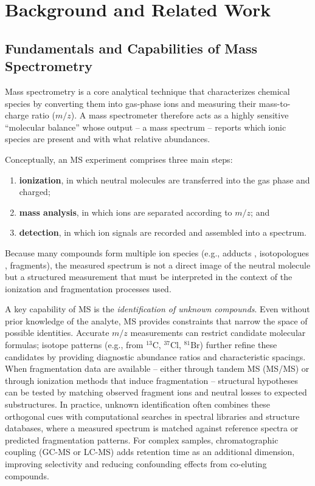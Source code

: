 \chapter{Background and Related Work}
\label{ch:2}
\noindent
\section{Fundamentals and Capabilities of Mass Spectrometry}
Mass spectrometry is a core analytical technique that characterizes chemical species by converting them into gas-phase ions and measuring their mass-to-charge ratio ($m/z$). \cite[p.~5]{Hoffmann2011}
A mass spectrometer therefore acts as a highly sensitive ``molecular balance'' whose output  -- a mass spectrum -- reports which ionic species are present and with what relative abundances.

Conceptually, an MS experiment comprises three main steps:
\begin{enumerate}[label=(\roman*)]
    \item \textbf{ionization}, in which neutral molecules are transferred into the gas phase and charged; \cite[p.~1]{Hoffmann2011}
    \item \textbf{mass analysis}, in which ions are separated according to $m/z$;
    and \item \textbf{detection}, in which ion signals are recorded and assembled into a spectrum. \cite[p.~5]{Hoffmann2011}
\end{enumerate}

Because many compounds form multiple ion species (e.g., adducts \cite[p.~21]{Hoffmann2011}, isotopologues \cite[p.~67]{Gross2006}, fragments), the measured spectrum is not a direct image of the neutral molecule but a structured measurement that must be interpreted in the context of the ionization and fragmentation processes used. \cite[p.~16-18]{Hoffmann2011}

A key capability of MS is the \emph{identification of unknown compounds}.
Even without prior knowledge of the analyte, MS provides constraints that narrow the space of possible identities.
Accurate $m/z$ measurements can restrict candidate molecular formulas;
isotope patterns (e.g., from $\mathrm{^{13}C}$, $\mathrm{^{37}Cl}$, $\mathrm{^{81}Br}$) further refine these candidates by providing diagnostic abundance ratios and characteristic spacings. \cite[p.~263]{Gross2006}
When fragmentation data are available -- either through tandem MS (MS/MS) or through ionization methods that induce fragmentation -- structural hypotheses can be tested by matching observed fragment ions and neutral losses to expected substructures. \cite[p.~225]{Gross2006}
In practice, unknown identification often combines these orthogonal cues with computational searches in spectral libraries and structure databases,
where a measured spectrum is matched against reference spectra or predicted fragmentation patterns. \cite[p.~8]{Scheubert2013}
For complex samples, chromatographic coupling (GC-MS or LC-MS) adds retention time as an additional dimension, \cite[p.~475]{Gross2006} improving selectivity and reducing confounding effects from co-eluting compounds. \cite[p.~233-237]{Hoffmann2011}


